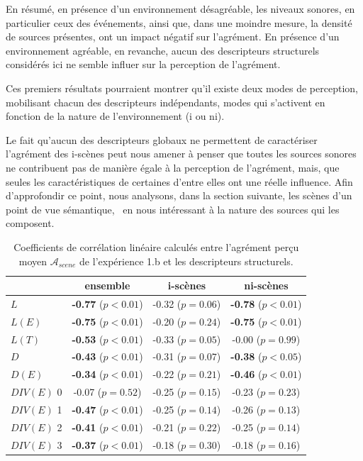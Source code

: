 En résumé, en présence d'un environnement désagréable, les niveaux sonores, en particulier ceux des événements, ainsi que, dans une moindre mesure, la densité de sources présentes, ont un impact négatif sur l'agrément. En présence d'un environnement agréable, en revanche, aucun des descripteurs structurels considérés ici ne semble influer sur la perception de l'agrément. 

Ces premiers résultats pourraient montrer qu'il existe deux modes de perception, mobilisant chacun des descripteurs indépendants, modes qui s'activent en fonction de la nature de l'environnement (i ou ni).

Le fait qu'aucun des descripteurs globaux ne permettent de caractériser l'agrément des i-scènes peut nous amener à penser que toutes les sources sonores ne contribuent pas de manière égale à la perception de l'agrément, mais, que seules les caractéristiques de certaines d'entre elles ont une réelle influence. Afin d'approfondir ce point, nous analysons, dans la section suivante, les scènes d'un point de vue sémantique, \ie~en nous intéressant à la nature des sources qui les composent. \\


\begin{table}[t]
\centering
\begin{tabular}{l c c c} 
               & ensemble                     & i-scènes                   & ni-scènes    \\
\hline
$L$            & \textbf{-0.77} ($p<0.01$)    & -0.32 ($p=0.06$)           & \textbf{-0.78} ($p<0.01$)\\
$L(E)$         & \textbf{-0.75} ($p<0.01$)    & -0.20 ($p=0.24$)           & \textbf{-0.75} ($p<0.01$)\\
$L(T)$         & \textbf{-0.53} ($p<0.01$)    & -0.33 ($p=0.05$)           &  -0.00 ($p=0.99$) \\
$D$            & \textbf{-0.43} ($p<0.01$)    & -0.31 ($p=0.07$)           & \textbf{-0.38} ($p<0.05$)\\
$D(E)$         & \textbf{-0.34} ($p<0.01$)    & -0.22 ($p=0.21$)           & \textbf{-0.46} ($p<0.01$)\\
$DIV(E)$ 0     &          -0.07 ($p=0.52$)    & -0.25 ($p=0.15$)           & -0.23 ($p=0.23$)\\
$DIV(E)$ 1     & \textbf{-0.47} ($p<0.01$)    & -0.25 ($p=0.14$)           & -0.26 ($p=0.13$)\\
$DIV(E)$ 2     & \textbf{-0.41} ($p<0.01$)    & -0.21 ($p=0.22$)           & -0.25 ($p=0.14$)\\
$DIV(E)$ 3     & \textbf{-0.37} ($p<0.01$)    & -0.18 ($p=0.30$)           & -0.18 ($p=0.16$)\\
\hline
\end{tabular}
\vspace{0.5mm}
\caption{Coefficients de corrélation linéaire calculés entre l'agrément perçu moyen $\mathcal{A}_{scene}$ de l'expérience 1.b et les descripteurs structurels.}
\label{tab:corrStructA}
\end{table}

